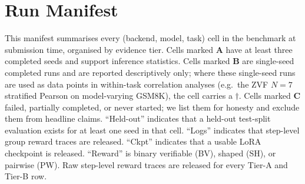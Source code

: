 \documentclass{article}
\begin{document}
 \section{Run Manifest}
\label{sec:run-manifest}

This manifest summarises every (backend, model, task) cell in the benchmark
at submission time, organised by evidence tier. Cells marked \textbf{A} have at
least three completed seeds and support inference statistics. Cells marked
\textbf{B} are single-seed completed runs and are reported descriptively only;
where these single-seed runs are used as data points in within-task
correlation analyses (e.g.\ the ZVF $N{=}7$ stratified Pearson on
model-varying GSM8K), the cell carries a $\dagger$. Cells marked
\textbf{C} failed, partially completed, or never started; we list
them for honesty and exclude them from headline claims. ``Held-out'' indicates
that a held-out test-split evaluation exists for at least one seed in that cell.
``Logs'' indicates that step-level group reward traces are released.
``Ckpt'' indicates that a usable LoRA checkpoint is released.
``Reward'' is binary verifiable (BV), shaped (SH), or pairwise (PW). Raw
step-level reward traces are released for every Tier-A and Tier-B row.
\end{document}
